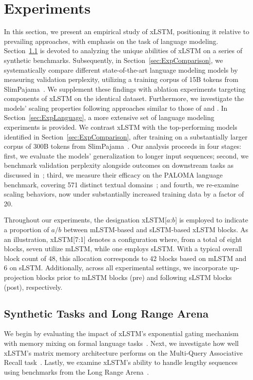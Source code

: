 \section{Experiments}
\label{sec:Exp}

In this section, we present an empirical study of xLSTM, positioning it relative to prevailing approaches, with emphasis on the task of language modeling. Section~\ref{sec:ExpSyntethic} is devoted to analyzing the unique abilities of xLSTM on a series of synthetic benchmarks. 
Subsequently, in Section~\ref{sec:ExpComparison}, we systematically compare different state-of-the-art language modeling models by measuring validation perplexity, utilizing a training corpus of 15B tokens from SlimPajama~\citep{Soboleva:23}. We supplement these findings with ablation experiments targeting components of xLSTM on the identical dataset. Furthermore, we investigate the models’ scaling properties following approaches similar to those of \citet{Kaplan:20} and \citet{Brown:20short}.
In Section~\ref{sec:ExpLanguage}, 
a more extensive set of language modeling experiments is provided. We contrast xLSTM with the top-performing models identified in Section~\ref{sec:ExpComparison}, after training on a substantially larger corpus of 300B tokens from SlimPajama~\citep{Soboleva:23}. Our analysis proceeds in four stages: first, we evaluate the models’ generalization to longer input sequences; second, we benchmark validation perplexity alongside outcomes on downstream tasks as discussed in~\citep{Sutawika:24}; third, we measure their efficacy on the PALOMA language benchmark, covering 571 distinct textual domains~\citep{Magnusson:23arxivshort}; and fourth, we re-examine scaling behaviors, now under substantially increased training data by a factor of 20.

\label{sec:xlstm_blocks_notation}
Throughout our experiments, the designation xLSTM[$a$:$b$] is employed to indicate a proportion of $a/b$ between mLSTM-based and sLSTM-based xLSTM blocks. As an illustration, xLSTM[7:1] denotes a configuration where, from a total of eight blocks, seven utilize mLSTM, while one employs sLSTM. With a typical overall block count of 48, this allocation corresponds to 42 blocks based on mLSTM and 6 on sLSTM. Additionally, across all experimental settings, we incorporate up-projection blocks prior to mLSTM blocks (pre) and following sLSTM blocks (post), respectively.

\subsection{Synthetic Tasks and Long Range Arena}
\label{sec:ExpSyntethic}
We begin by evaluating the impact of xLSTM’s exponential gating mechanism with memory mixing on formal language tasks~\citep{Deletang:23}. Next, we investigate how well xLSTM’s matrix memory architecture performs on the Multi-Query Associative Recall task~\citep{Arora:23arxiv}. Lastly, we examine xLSTM’s ability to handle lengthy sequences using benchmarks from the Long Range Arena~\citep{Tay:21}.

